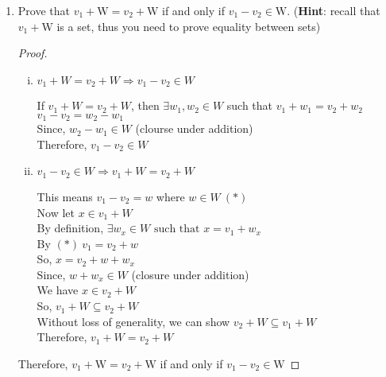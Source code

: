 \documentclass[11pt]{scrartcl}
\begin{document}
\begin{enumerate}[label=\alph*.]
	\item{
	      Prove that \(v_{1}+\mathrm{W}=v_{2}+\mathrm{W}\) if and only if \(v_{1}-v_{2} \in \mathrm{W}\).
	      (\textbf{Hint}: recall that $v_{1}+\mathrm{W}$ is a set, thus you need to prove equality between sets)
	      \begin{proof}\-\
		      \begin{enumerate}[i.]
			      \item{
			            $v_1 + W = v_2 + W \Rightarrow v_1 - v_2 \in W$\par
			            If $v_1 + W = v_2 + W$, then $\exists w_1, w_2 \in W$ such that
			            $v_1 + w_1 = v_2 + w_2$\\
			            $v_1 - v_2 = w_2 - w_1$\\
			            Since, $w_2 - w_1 \in W$ (clourse under addition)\\
			            Therefore, $v_1 - v_2 \in W$
			            }
			      \item{
			            $v_1 - v_2 \in W \Rightarrow v_1 + W = v_2 + W $\par
			            This means $v_1 - v_2 = w$ where $w \in W \ (*)$\\
			            Now let $x \in v_1 + W$\\
			            By definition, $\exists w_x \in W \text{ such that } x = v_1 + w_x$\\
			            By $(*) \ v_1 = v_2 + w$\\
			            So, $x = v_2 + w + w_x$\\
			            Since, $w + w_x \in W$ (closure under addition)\\
			            We have $x \in v_2 + W$\\
			            So, $v_1 + W \subseteq v_2 + W$\\
			            Without loss of generality, we can show $v_2 + W \subseteq v_1 + W$\\
			            Therefore, $v_1 + W = v_2 + W$
			            }
		      \end{enumerate}
		      Therefore, \(v_{1}+\mathrm{W}=v_{2}+\mathrm{W}\) if and only if \(v_{1}-v_{2} \in \mathrm{W}\)
	      \end{proof}
	      }


\end{enumerate}
\end{document}
